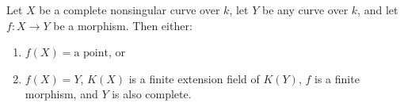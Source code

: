 Let $X$ be a complete nonsingular curve over $k$, let $Y$ be any curve over $k$, and let $f: X \rightarrow Y$ be a morphism. Then either:
\begin{enumerate}
\item[(1)] $f(X) = \text{a point}$, or
\item[(2)] $f(X) = Y$, $K(X)$ is a finite extension field of $K(Y)$, $f$ is a finite morphism, and $Y$ is also complete.
\end{enumerate}
